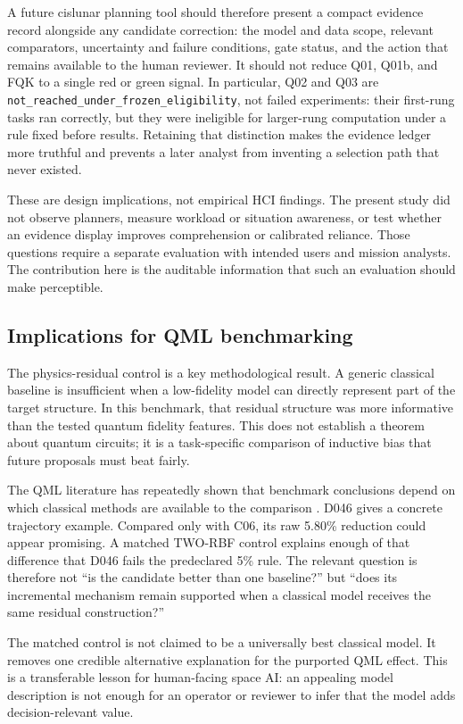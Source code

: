 A future cislunar planning tool should therefore present a compact evidence
record alongside any candidate correction: the model and data scope, relevant
comparators, uncertainty and failure conditions, gate status, and the action
that remains available to the human reviewer. It should not reduce Q01, Q01b,
and FQK to a single red or green signal. In particular, Q02 and Q03 are
\texttt{not\_reached\_under\_frozen\_eligibility}, not failed experiments:
their first-rung tasks ran correctly, but they were ineligible for larger-rung
computation under a rule fixed before results. Retaining that distinction makes
the evidence ledger more truthful and prevents a later analyst from inventing
a selection path that never existed.

These are design implications, not empirical HCI findings. The present study
did not observe planners, measure workload or situation awareness, or test
whether an evidence display improves comprehension or calibrated reliance.
Those questions require a separate evaluation with intended users and mission
analysts. The contribution here is the auditable information that such an
evaluation should make perceptible.

\subsection{Implications for QML benchmarking}

The physics-residual control is a key methodological result. A generic
classical baseline is insufficient when a low-fidelity model can directly
represent part of the target structure. In this benchmark, that residual
structure was more informative than the tested quantum fidelity features. This
does not establish a theorem about quantum circuits; it is a task-specific
comparison of inductive bias that future proposals must beat fairly.

The QML literature has repeatedly shown that benchmark conclusions depend on
which classical methods are available to the comparison
\cite{bowles2024,schnabel2024}. D046 gives a concrete trajectory example.
Compared only with C06, its raw 5.80\% reduction could appear promising. A
matched TWO-RBF control explains enough of that difference that D046 fails the
predeclared 5\% rule. The relevant question is therefore not ``is the
candidate better than one baseline?'' but ``does its incremental mechanism
remain supported when a classical model receives the same residual
construction?''

The matched control is not claimed to be a universally best classical model.
It removes one credible alternative explanation for the purported QML effect.
This is a transferable lesson for human-facing space AI: an appealing model
description is not enough for an operator or reviewer to infer that the model
adds decision-relevant value.

